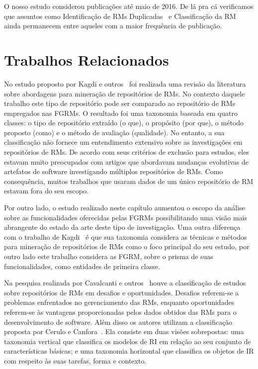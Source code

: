 O nosso estudo considerou publicações até maio de 2016. De lá pra cá verificamos
que assuntos como Identificação de RMs Duplicadas~\cite{aggarwal2017detecting,
    chaparro2017improving, sadat2017rediscovery} e Classificação da
RM~\cite{karim2017understanding, zibran2016effectiveness, ohira2016case} ainda
permanecem entre aqueles com a maior frequência de publicação.

\section{Trabalhos Relacionados}
\label{sec:map_trabalhos_relacionados}

No estudo proposto por Kagdi e outros~\cite{kagdi2012assigning} foi realizada
uma revisão da literatura sobre abordagens para mi\-ne\-ra\-ção de repositórios
de RMs. No contexto daquele trabalho este tipo de repositório pode ser
comparado ao repositório de RMs empregados nas FGRMs. O resultado foi uma
taxonomia baseada em quatro classes: o tipo de repositório extraído (o que), o
propósito (por que), o método proposto (como) e o método de avaliação
(qualidade). No entanto, a sua classificação não fornece um entendimento
extensivo sobre as investigações em repositórios de RMs\@. De acordo com seus
critérios de exclusão para estudos, eles estavam muito preocupados com artigos
que abordavam mudanças evolutivas de artefatos de software investigando
múltiplos repositórios de RMs. Como consequência, muitos trabalhos que usaram
dados de um único repositório de RM estavam fora do seu escopo.

Por outro lado, o estudo realizado neste capítulo aumentou o escopo da análise
sobre as funcionalidades oferecidas pelas FGRMs possibilitando uma visão mais
abrangente do estado da arte deste tipo de investigação. Uma outra diferença
com o trabalho de Kagdi~\cite{kagdi2012assigning} é que sua taxonomia considera
as técnicas e métodos para mineração de repositórios de RMs como o foco
principal do seu estudo, por outro lado este trabalho considera as FGRM, sobre
o prisma de suas funcionalidades, como entidades de primeira classe.

Na pesquisa realizada por Cavalcanti e outros~\cite{cavalcanti2014challenges}
houve a classificação de estudos sobre repositórios de RMs em desafios e
oportunidades. Desafios referem-se a problemas enfrentados no gerenciamento das
RMs, enquanto oportunidades referem-se às vantagens proporcionadas pelos dados
obtidos das  RMs para o desenvolvimento de software. Além disso os autores
utilizam a classificação proposta por Cerulo e
Canfora~\cite{cerulo2004taxonomy}. Ela consiste em duas visões sobrepostas: uma
taxonomia vertical que classifica os modelos de RI em relação ao seu conjunto
de características básicas; e uma taxonomia horizontal que classifica os
objetos de IR com respeito às suas tarefas, forma e contexto.

